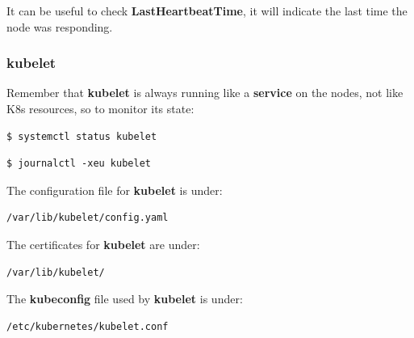 \documentclass{article}
\newenvironment{blocktemplateII}[1]{%
    \tcolorbox[beamer,%
    noparskip,breakable,
    colframe=Green,%
    colbacklower=LimeGreen!75!LightGreen,%
    title=#1]}%
    {\endtcolorbox}
\newenvironment{codetemplate}[1][]{%
  \mybasecolorbox[#1]
  \itshape
}{%
  \endmybasecolorbox
}
\begin{document}
\begin{blocktemplateII}{Note}
It can be useful to check \textbf{LastHeartbeatTime}, it will indicate the last time the node was responding.
\end{blocktemplateII}

\subsubsection{kubelet}
Remember that \textbf{kubelet} is always running like a \textbf{service} on the nodes, not like K8s resources, so to monitor its state:
\begin{codetemplate}
\begin{verbatim}
$ systemctl status kubelet
\end{verbatim}
\end{codetemplate}
\begin{codetemplate}
\begin{verbatim}
$ journalctl -xeu kubelet
\end{verbatim}
\end{codetemplate}

The configuration file for \textbf{kubelet} is under:
\begin{codetemplate}
\begin{verbatim}
/var/lib/kubelet/config.yaml
\end{verbatim}
\end{codetemplate}

The certificates for \textbf{kubelet} are under:
\begin{codetemplate}
\begin{verbatim}
/var/lib/kubelet/
\end{verbatim}
\end{codetemplate}

The \textbf{kubeconfig} file used by \textbf{kubelet} is under:
\begin{codetemplate}
\begin{verbatim}
/etc/kubernetes/kubelet.conf
\end{verbatim}
\end{codetemplate}
\end{document}
